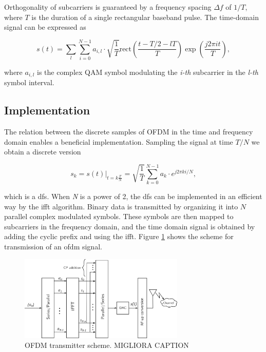 Orthogonality of subcarriers is guaranteed by a frequency spacing $\Delta f$ of $1/T$, where $T$ is the duration of a single rectangular baseband pulse.
The time-domain signal can be expressed as

\begin{equation}
    s(t) = \sum_l\sum_{i=0}^{N-1} a_{i,l}\cdot \sqrt{\frac{1}{T}} \mathrm{rect} \left( \frac{t-T/2 - lT}{T} \right)\exp{\left(\frac{j2\pi it}{T}\right)},
\end{equation}

where $a_{i,l}$ is the complex QAM symbol modulating the \textit{i-th} subcarrier in the \textit{l-th} symbol interval.

\subsection{Implementation}
The relation between the discrete samples of OFDM in the time and frequency domain enables a beneficial implementation.
Sampling the signal at time $T/N$ we obtain a discrete version

\begin{equation}
    s_k = s(t)|_{t=k \frac{T}{N}} = \sqrt{\frac{1}{T}}\sum_{k=0}^{N-1} a_k \cdot e^{j2\pi ki/N},
\end{equation}

which is a \gls{dfs}. When \textit{N} is a power of 2, the \gls{dfs} can be implemented in an efficient way by the \gls{ifft} algorithm.
Binary data is transmitted by organizing it into $N$ parallel complex modulated symbols. These symbols are then mapped to subcarriers in the frequency domain, and the time domain signal is obtained by adding the cyclic prefix and using the \gls{ifft}. Figure \ref{fig:ofdm_transmit} shows the scheme for transmission of an \gls{ofdm} signal.

\begin{figure}[H]
	\centering
	\includegraphics[width=0.7\textwidth]{Images/theoretical/ofdm/ofdm_transmit.png}
	\caption{OFDM transmitter scheme. \alert{MIGLIORA CAPTION}}
	\label{fig:ofdm_transmit}
\end{figure}

